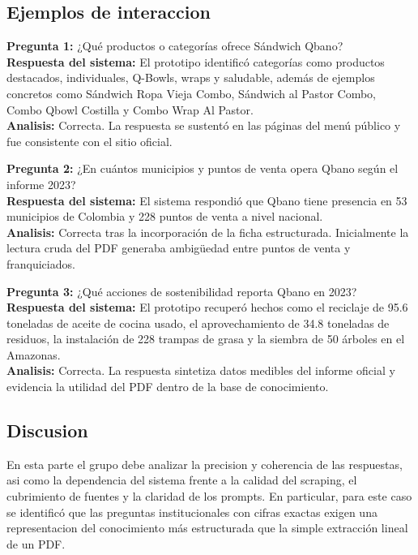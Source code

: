 \documentclass[journal]{IEEEtran}
\begin{document}
\subsection{Ejemplos de interaccion}
\textbf{Pregunta 1:} ¿Qué productos o categorías ofrece Sándwich Qbano?\\
\textbf{Respuesta del sistema:} El prototipo identificó categorías como productos destacados, individuales, Q-Bowls, wraps y saludable, además de ejemplos concretos como Sándwich Ropa Vieja Combo, Sándwich al Pastor Combo, Combo Qbowl Costilla y Combo Wrap Al Pastor.\\
\textbf{Analisis:} Correcta. La respuesta se sustentó en las páginas del menú público y fue consistente con el sitio oficial.

\vspace{0.2cm}

\textbf{Pregunta 2:} ¿En cuántos municipios y puntos de venta opera Qbano según el informe 2023?\\
\textbf{Respuesta del sistema:} El sistema respondió que Qbano tiene presencia en 53 municipios de Colombia y 228 puntos de venta a nivel nacional.\\
\textbf{Analisis:} Correcta tras la incorporación de la ficha estructurada. Inicialmente la lectura cruda del PDF generaba ambigüedad entre puntos de venta y franquiciados.

\vspace{0.2cm}

\textbf{Pregunta 3:} ¿Qué acciones de sostenibilidad reporta Qbano en 2023?\\
\textbf{Respuesta del sistema:} El prototipo recuperó hechos como el reciclaje de 95.6 toneladas de aceite de cocina usado, el aprovechamiento de 34.8 toneladas de residuos, la instalación de 228 trampas de grasa y la siembra de 50 árboles en el Amazonas.\\
\textbf{Analisis:} Correcta. La respuesta sintetiza datos medibles del informe oficial y evidencia la utilidad del PDF dentro de la base de conocimiento.

\subsection{Discusion}
En esta parte el grupo debe analizar la precision y coherencia de las respuestas, asi como la dependencia del sistema frente a la calidad del scraping, el cubrimiento de fuentes y la claridad de los prompts. En particular, para este caso se identificó que las preguntas institucionales con cifras exactas exigen una representacion del conocimiento más estructurada que la simple extracción lineal de un PDF.
\end{document}
